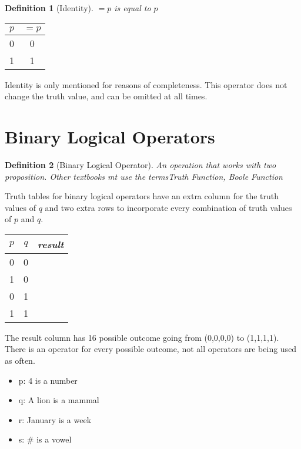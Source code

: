 \documentclass[10pt,a4paper,draft,titlepage,onecolumn]{book}
\newtheorem{definition}{Definition}[section]
\begin{document}
\begin{definition}[Identity]
$=p$ is equal to $p$
\end{definition}

\begin{center}
\begin{tabular}{ |c|c| }
 \hline
 $p$ & $=p$  \\
 \hline
 0 &0 \\
 1 & 1\\
 \hline
\end{tabular} 
\end{center} 
Identity is only mentioned for reasons of completeness. This operator does not change the truth value, and can be omitted at all times.

\section{Binary Logical Operators}
\begin{definition}[Binary Logical Operator]
An operation that works with two proposition. Other textbooks mt use the terms\textit{Truth Function}, \textit{Boole Function}
\end{definition}
Truth tables for binary logical operators have an extra column for the truth values of $q$ and two extra rows to incorporate every combination of truth values of $p$ and $q$.
\begin{center}
\begin{tabular}{ |c|c|c| }

 \hline
 $p$ & $q$ & \textit{result} \\
 \hline
 0 & 0 &  \\
 1 & 0 &  \\
 0 & 1 &  \\
 1 & 1 &  \\
 \hline
\end{tabular}
\end{center}
The result column has 16 possible outcome going from (0,0,0,0) to  (1,1,1,1). There is an operator for every possible outcome, not all operators are being used as often.

\begin{itemize}
\item p: 4 is a number
\item q: A lion is a mammal 
\item r: January is a week
\item s: \# is a vowel
\end{itemize} 
\end{document}
